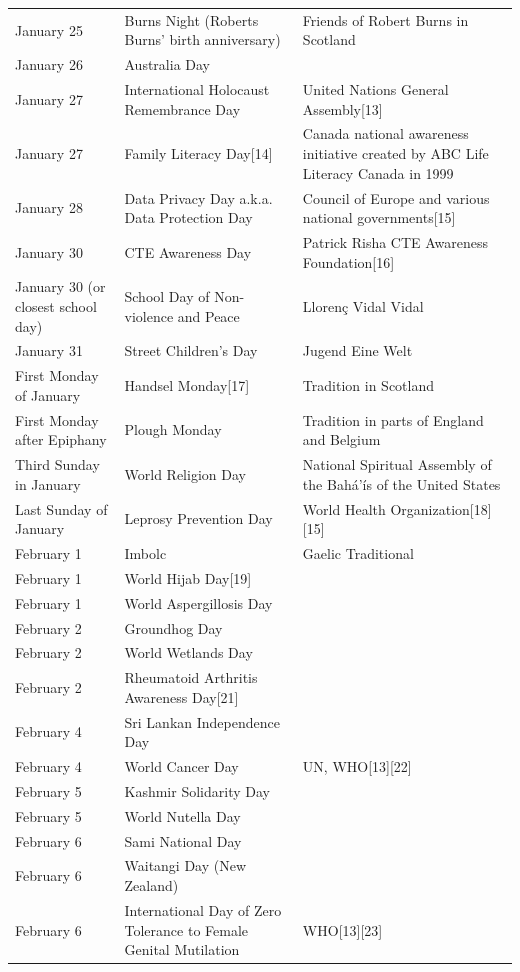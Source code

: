 \documentclass[
]{book}
\begin{document}
\begin{longtable}[t]{>{\raggedright\arraybackslash}p{8em}>{\raggedright\arraybackslash}p{20em}>{\raggedright\arraybackslash}p{12em}}
January 25 & Burns Night (Roberts Burns' birth anniversary) & Friends of Robert Burns in Scotland\\
January 26 & Australia Day & \\
January 27 & International Holocaust Remembrance Day & United Nations General Assembly[13]\\
January 27 & Family Literacy Day[14] & Canada national awareness initiative created by ABC Life Literacy Canada in 1999\\
January 28 & Data Privacy Day a.k.a. Data Protection Day & Council of Europe and various national governments[15]\\
\addlinespace
January 30 & CTE Awareness Day & Patrick Risha CTE Awareness Foundation[16]\\
January 30 (or closest school day) & School Day of Non-violence and Peace & Llorenç Vidal Vidal\\
January 31 & Street Children's Day & Jugend Eine Welt\\
First Monday of January & Handsel Monday[17] & Tradition in Scotland\\
First Monday after Epiphany & Plough Monday & Tradition in parts of England and Belgium\\
\addlinespace
Third Sunday in January & World Religion Day & National Spiritual Assembly of the Bahá'ís of the United States\\
Last Sunday of January & Leprosy Prevention Day & World Health Organization[18][15]\\
February 1 & Imbolc & Gaelic Traditional\\
February 1 & World Hijab Day[19] & \\
February 1 & World Aspergillosis Day & [20]\\
\addlinespace
February 2 & Groundhog Day & \\
February 2 & World Wetlands Day & \\
February 2 & Rheumatoid Arthritis Awareness Day[21] & \\
February 4 & Sri Lankan Independence Day & \\
February 4 & World Cancer Day & UN, WHO[13][22]\\
\addlinespace
February 5 & Kashmir Solidarity Day & \\
February 5 & World Nutella Day & \\
February 6 & Sami National Day & \\
February 6 & Waitangi Day (New Zealand) & \\
February 6 & International Day of Zero Tolerance to Female Genital Mutilation & WHO[13][23]\\

\end{longtable}
\end{document}
